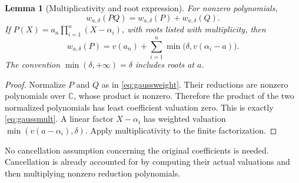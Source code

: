 \documentclass[11pt,letterpaper]{article}
\numberwithin{equation}{section}
\newtheorem{lemma}[lemma]{Lemma}
\theoremstyle{definition}
\theoremstyle{remark}
\newcommand{\C}{\mathbb C}
\begin{document}
\begin{lemma}[Multiplicativity and root expression]\label{lem:gauss}
For nonzero polynomials,
\begin{equation}\label{eq:gaussmult}
 w_{a,\delta}(PQ)=w_{a,\delta}(P)+w_{a,\delta}(Q).
\end{equation}
If $P(X)=a_n\prod_{i=1}^n(X-\alpha_i)$, with roots listed with
multiplicity, then
\begin{equation}\label{eq:gaussroots}
 w_{a,\delta}(P)=v(a_n)+\sum_{i=1}^n
                       \min\bigl(\delta,v(\alpha_i-a)\bigr).
\end{equation}
The convention $\min(\delta,+\infty)=\delta$ includes roots at $a$.
\end{lemma}
\begin{proof}
Normalize $P$ and $Q$ as in \eqref{eq:gaussweight}. Their reductions are
nonzero polynomials over $\C$, whose product is nonzero. Therefore the
product of the two normalized polynomials has least coefficient valuation
zero. This is exactly \eqref{eq:gaussmult}. A linear factor
$X-\alpha_i$ has weighted valuation
$\min(v(a-\alpha_i),\delta)$. Apply multiplicativity to the finite
factorization.
\end{proof}

No cancellation assumption concerning the original coefficients is
needed. Cancellation is already accounted for by computing their actual
valuations and then multiplying nonzero reduction polynomials.
\end{document}
